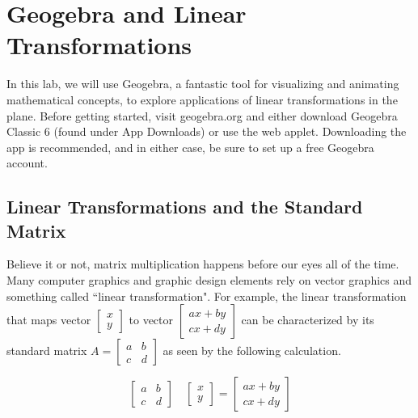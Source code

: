 \section{Geogebra and Linear Transformations}

 
 \noindent In this lab, we will use Geogebra, a fantastic tool for visualizing and animating mathematical concepts, to explore applications of linear transformations in the plane. Before getting started, visit geogebra.org and either download Geogebra Classic 6 (found under App Downloads) or use the web applet. Downloading the app is recommended, and in either case, be sure to set up a free Geogebra account.

\subsection{Linear Transformations and the Standard Matrix}

Believe it or not, matrix multiplication happens before our eyes all of the time. Many computer graphics and graphic design elements rely on vector graphics and something called ``linear transformation".
For example, the linear transformation that maps vector $\left[\begin{array}{c}
x\\
y
\end{array}\right]$ to vector $\left[\begin{array}{c}
ax + by\\
cx + dy
\end{array}\right]$ can be characterized by its standard matrix $A = \left[\begin{array}{cc}
a & b\\
c & d
\end{array}\right]$ as seen by the following calculation.

\begin{example}
\[\left[\begin{array}{cc}
a & b\\
c & d
\end{array}\right] \hspace{1em} \left[\begin{array}{c}
x\\
y
\end{array}\right] = \left[\begin{array}{c}
ax + by\\
cx + dy
\end{array}\right]\]
\end{example}

